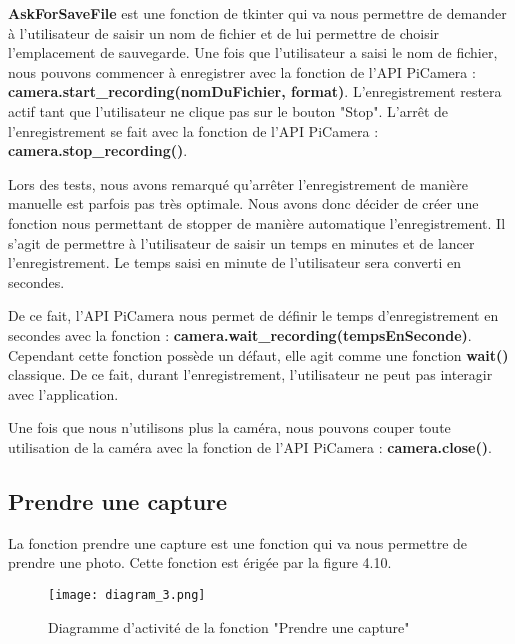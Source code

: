             \vspace{0.2cm}
            
            \textbf{AskForSaveFile} est une fonction de tkinter qui va nous permettre de demander à l'utilisateur de saisir un nom de fichier et de lui permettre de choisir l'emplacement de sauvegarde. Une fois que l'utilisateur a saisi le nom de fichier, nous pouvons commencer à enregistrer avec la fonction de l'API PiCamera : \textbf{camera.start\_recording(nomDuFichier, format)}.
            L'enregistrement restera actif tant que l'utilisateur ne clique pas sur le bouton "Stop".
            L'arrêt de l'enregistrement se fait avec la fonction de l'API PiCamera : \textbf{camera.stop\_recording()}.

            \vspace{0.2cm}

            Lors des tests, nous avons remarqué qu'arrêter l'enregistrement de manière manuelle est parfois pas très optimale.
            Nous avons donc décider de créer une fonction nous permettant de stopper de manière automatique l'enregistrement. Il s'agit de permettre à l'utilisateur de saisir un temps en minutes et de lancer l'enregistrement. Le temps saisi en minute de l'utilisateur sera converti en secondes.

            \vspace{0.2cm}

            De ce fait, l'API PiCamera nous permet de définir le temps d'enregistrement en secondes avec la fonction : \textbf{camera.wait\_recording(tempsEnSeconde)}. Cependant cette fonction possède un défaut, elle agit comme une fonction \textbf{wait()} classique. De ce fait, durant l'enregistrement, l'utilisateur ne peut pas interagir avec l'application. 
            
            \vspace{0.2cm}

            Une fois que nous n'utilisons plus la caméra, nous pouvons couper toute utilisation de la caméra avec la fonction de l'API PiCamera : \textbf{camera.close()}.
            
        \subsection{Prendre une capture}
        La fonction prendre une capture est une fonction qui va nous permettre de prendre une photo.
        Cette fonction est érigée par la figure 4.10.
        \begin{figure}[ht]
            \centering
            \texttt{[image: diagram\_3.png]} 
            \caption{Diagramme d'activité de la fonction "Prendre une capture"}
        \end{figure}

